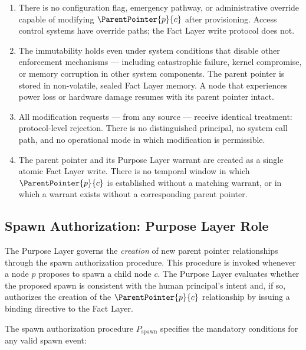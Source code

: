 \begin{enumerate}
    \item[(E1) \textbf{No override path.}] There is no configuration flag, emergency pathway, or administrative override capable of modifying $\ParentPointer{p}{c}$ after provisioning. Access control systems have override paths; the Fact Layer write protocol does not.

    \item[(E2) \textbf{Failure-state resilience.}] The immutability holds even under system conditions that disable other enforcement mechanisms --- including catastrophic failure, kernel compromise, or memory corruption in other system components. The parent pointer is stored in non-volatile, sealed Fact Layer memory. A node that experiences power loss or hardware damage resumes with its parent pointer intact.

    \item[(E3) \textbf{Source-equivalence of enforcement.}] All modification requests --- from any source --- receive identical treatment: protocol-level rejection. There is no distinguished principal, no system call path, and no operational mode in which modification is permissible.

    \item[(E4) \textbf{Atomic warrant-pointer creation.}] The parent pointer and its Purpose Layer warrant are created as a single atomic Fact Layer write. There is no temporal window in which $\ParentPointer{p}{c}$ is established without a matching warrant, or in which a warrant exists without a corresponding parent pointer.
\end{enumerate}

\subsection{Spawn Authorization: Purpose Layer Role}
\label{sec:purpose-layer-spawn-authorization}

The Purpose Layer governs the \textit{creation} of new parent pointer relationships through the spawn authorization procedure. This procedure is invoked whenever a node $p$ proposes to spawn a child node $c$. The Purpose Layer evaluates whether the proposed spawn is consistent with the human principal's intent and, if so, authorizes the creation of the $\ParentPointer{p}{c}$ relationship by issuing a binding directive to the Fact Layer.

The spawn authorization procedure $P_{\mathrm{spawn}}$ specifies the mandatory conditions for any valid spawn event:

